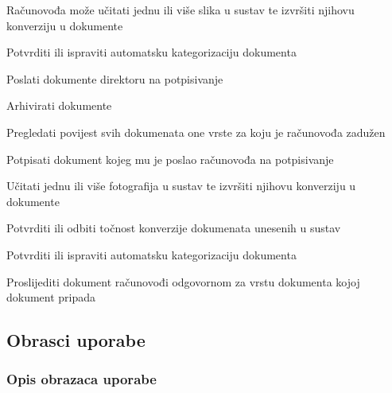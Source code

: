 \begin{packed_enum}
\begin{packed_enum}
				\end{packed_enum}
			
				\item  {}
				
				\begin{packed_enum}
					\item Računovođa može učitati jednu ili više slika u sustav te izvršiti njihovu konverziju u dokumente
					\item Potvrditi ili ispraviti automatsku kategorizaciju dokumenta
					\item Poslati dokumente direktoru na potpisivanje
					\item Arhivirati dokumente
					\item Pregledati povijest svih dokumenata one vrste za koju je računovođa zadužen
				\end{packed_enum}
			
				\item  {}
			
				\begin{packed_enum}
					
					\item Potpisati dokument kojeg mu je poslao računovođa na potpisivanje
					\item Učitati jednu ili više fotografija u sustav te izvršiti njihovu konverziju u dokumente
					\item Potvrditi ili odbiti točnost konverzije dokumenata unesenih u sustav
					\item Potvrditi ili ispraviti automatsku kategorizaciju dokumenta
					\item Proslijediti dokument računovođi odgovornom za vrstu dokumenta kojoj dokument pripada
					
				\end{packed_enum}
			
			\end{packed_enum}
			
			\eject 
			
			
				
			\subsection{Obrasci uporabe}
					
				\subsubsection{Opis obrazaca uporabe}
					
